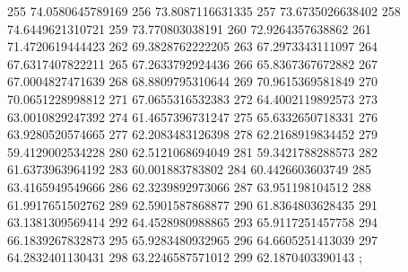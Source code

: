 {255 74.0580645789169
256 73.8087116631335
257 73.6735026638402
258 74.6449621310721
259 73.770803038191
260 72.9264357638862
261 71.4720619444423
262 69.3828762222205
263 67.2973343111097
264 67.6317407822211
265 67.2633792924436
266 65.8367367672882
267 67.0004827471639
268 68.8809795310644
269 70.9615369581849
270 70.0651228998812
271 67.0655316532383
272 64.4002119892573
273 63.0010829247392
274 61.4657396731247
275 65.6332650718331
276 63.9280520574665
277 62.2083483126398
278 62.2168919834452
279 59.4129002534228
280 62.5121068694049
281 59.3421788288573
282 61.6373963964192
283 60.001883783802
284 60.4426603603749
285 63.4165949549666
286 62.3239892973066
287 63.951198104512
288 61.9917651502762
289 62.5901587868877
290 61.8364803628435
291 63.1381309569414
292 64.4528980988865
293 65.9117251457758
294 66.1839267832873
295 65.9283480932965
296 64.6605251413039
297 64.2832401130431
298 63.2246587571012
299 62.1870403390143
};
